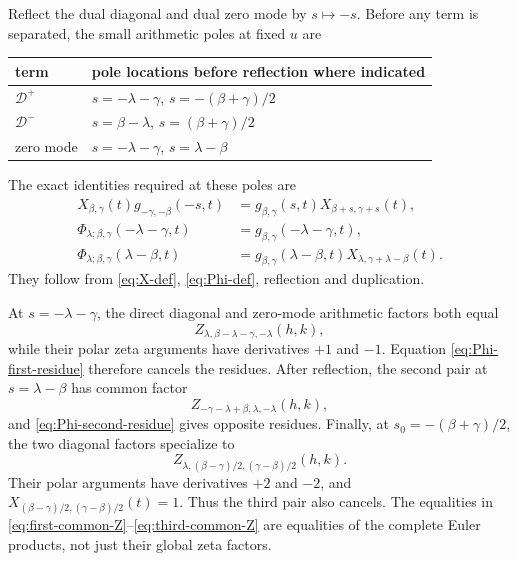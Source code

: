 Reflect the dual diagonal and dual zero mode by $s\mapsto-s$.  Before any
term is separated, the small arithmetic poles at fixed $u$ are
\begin{center}
\begin{tabular}{ll}
\toprule
term & pole locations before reflection where indicated\\
\midrule
$\mathcal D^+$ & $s=-\lambda-\gamma$, $s=-(\beta+\gamma)/2$\\
$\mathcal D^-$ & $s=\beta-\lambda$, $s=(\beta+\gamma)/2$\\
zero mode & $s=-\lambda-\gamma$, $s=\lambda-\beta$\\
\bottomrule
\end{tabular}
\end{center}
The exact identities required at these poles are
\begin{align}
 X_{\beta,\gamma}(t)g_{-\gamma,-\beta}(-s,t)
 &=g_{\beta,\gamma}(s,t)X_{\beta+s,\gamma+s}(t),
 \label{eq:g-diagonal-reflection}\\
 \Phi_{\lambda;\beta,\gamma}(-\lambda-\gamma,t)
 &=g_{\beta,\gamma}(-\lambda-\gamma,t),
 \label{eq:Phi-first-residue}\\
 \Phi_{\lambda;\beta,\gamma}(\lambda-\beta,t)
 &=g_{\beta,\gamma}(\lambda-\beta,t)
 X_{\lambda,\gamma+\lambda-\beta}(t).
 \label{eq:Phi-second-residue}
\end{align}
They follow from \eqref{eq:X-def}, \eqref{eq:Phi-def}, reflection and
duplication.

At $s=-\lambda-\gamma$, the direct diagonal and zero-mode arithmetic factors
both equal
\begin{equation}\label{eq:first-common-Z}
              Z_{\lambda,\beta-\lambda-\gamma,-\lambda}(h,k),
\end{equation}
while their polar zeta arguments have derivatives $+1$ and $-1$.
Equation \eqref{eq:Phi-first-residue} therefore cancels the residues.  After
reflection, the second pair at $s=\lambda-\beta$ has common factor
\begin{equation}\label{eq:second-common-Z}
              Z_{-\gamma-\lambda+\beta,\lambda,-\lambda}(h,k),
\end{equation}
and \eqref{eq:Phi-second-residue} gives opposite residues.  Finally, at
$s_0=-(\beta+\gamma)/2$, the two diagonal factors specialize to
\begin{equation}\label{eq:third-common-Z}
 Z_{\lambda,(\beta-\gamma)/2,(\gamma-\beta)/2}(h,k).
\end{equation}
Their polar arguments have derivatives $+2$ and $-2$, and
$X_{(\beta-\gamma)/2,(\gamma-\beta)/2}(t)=1$.  Thus the third pair also
cancels.  The equalities in \eqref{eq:first-common-Z}--\eqref{eq:third-common-Z}
are equalities of the complete Euler products, not just their global zeta
factors.

